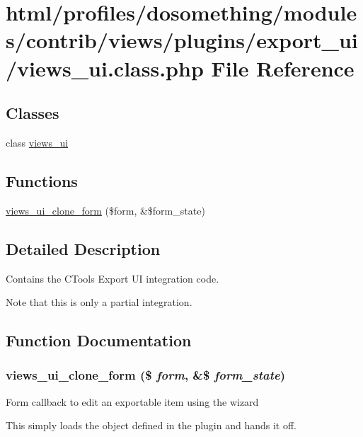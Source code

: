\hypertarget{views__ui_8class_8php}{
\section{html/profiles/dosomething/modules/contrib/views/plugins/export\_\-ui/views\_\-ui.class.php File Reference}
\label{views__ui_8class_8php}
}
\subsection*{Classes}
\begin{DoxyCompactItemize}
\item 
class \hyperlink{classviews__ui}{views\_\-ui}
\end{DoxyCompactItemize}
\subsection*{Functions}
\begin{DoxyCompactItemize}
\item 
\hyperlink{views__ui_8class_8php_a198d10ccbedfcd8de8b9e45a516fc9c4}{views\_\-ui\_\-clone\_\-form} (\$form, \&\$form\_\-state)
\end{DoxyCompactItemize}


\subsection{Detailed Description}
Contains the CTools Export UI integration code.

Note that this is only a partial integration. 

\subsection{Function Documentation}
\hypertarget{views__ui_8class_8php_a198d10ccbedfcd8de8b9e45a516fc9c4}{
\subsubsection[{views\_\-ui\_\-clone\_\-form}]{\setlength{\rightskip}{0pt plus 5cm}views\_\-ui\_\-clone\_\-form (\$ {\em form}, \/  \&\$ {\em form\_\-state})}}
\label{views__ui_8class_8php_a198d10ccbedfcd8de8b9e45a516fc9c4}
Form callback to edit an exportable item using the wizard

This simply loads the object defined in the plugin and hands it off. 